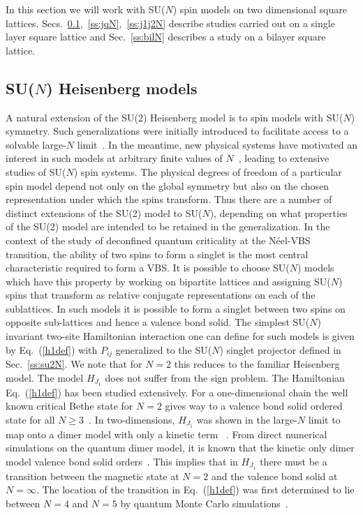 \documentclass[range]{ar2e}
\begin{document}
In this section we will work with SU($N$) spin models on two
dimensional  square
lattices. Secs.~\ref{ss:j1N},~\ref{ss:jqN},~\ref{ss:j1j2N} describe
studies carried out on a single layer square lattice and
Sec.~\ref{ss:bilN} describes a study on a bilayer square
lattice. 

\subsection{SU($N$) Heisenberg models}
\label{ss:j1N}
A natural extension of the SU(2) Heisenberg model is to spin models with
SU($N$) symmetry. Such generalizations were initially introduced to
facilitate access to
a solvable large-$N$ limit~\cite{affleck1985:lgN,Read89}. In the meantime, new physical systems have
motivated an interest in such models at arbitrary finite values of
$N$~\cite{gorshkov2010:sun,kugel1982:kk}, leading to extensive studies of SU($N$) spin systems. The physical degrees of freedom of a particular
spin model depend not only on the global symmetry but also on the
chosen representation under which the spins transform. Thus there are
a number of distinct extensions of the SU(2) model to SU($N$), depending on
what properties of the SU(2) model are intended to be retained in the
generalization. In the context of the study of deconfined quantum criticality at the
N\'eel-VBS transition, the ability of two spins to form a singlet is the most
central characteristic required to form a VBS. It
is possible to choose SU($N$) models which have this property by
working on bipartite lattices and
assigning SU($N$) spins that transform
as relative conjugate representations
 on each of the sublattices. In such models it is possible to form a singlet
between two spins on opposite sub-lattices and hence a valence bond
solid.  The simplest SU($N$) invariant two-site Hamiltonian interaction one can define for
such models is given by Eq.~(\ref{h1def}) with $P_{ij}$ generalized to the SU($N$) 
singlet projector defined in Sec.~\ref{ss:su2N}. We note that for $N=2$ this reduces to the familiar
Heisenberg model. The model $H_{J_1}$ does not suffer from the sign
problem. The Hamiltonian Eq.~(\ref{h1def}) has been studied extensively. For a 
one-dimensional chain the well known critical Bethe state for $N=2$ gives way to a valence bond solid
ordered state for all $N\geq 3$~\cite{barber1989:d1n3_vbs,klumper1989:d1n3_vbs,affleck1985:lgN}.   In two-dimensions, $H_{J_1}$ was shown in the large-$N$ limit to map onto a dimer model
with only a kinetic term
~\cite{read1989:nucphysB}. From direct numerical simulations
on the quantum dimer model, it is known that the kinetic only dimer model
valence bond solid orders~\cite{sachdev1989:qd_vbs}.  This implies that in $H_{J_1}$ there must be a transition
between the magnetic state at $N=2$ and the valence bond solid at
$N=\infty$.  The location of the transition in Eq.~(\ref{h1def}) was first
determined to lie between $N=4$ and $N=5$ by quantum Monte Carlo
simulations~\cite{harada2003:sun}.
\end{document}
